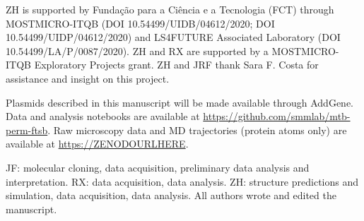 \documentclass[twocolumn,pdflatex,sn-nature]{sn-jnl}%
\begin{document}

ZH is supported by Fundação para a Ciência e a Tecnologia (FCT) through MOSTMICRO-ITQB (DOI 10.54499/UIDB/04612/2020; DOI 10.54499/UIDP/04612/2020) and LS4FUTURE Associated Laboratory (DOI 10.54499/LA/P/0087/2020).
ZH and RX are supported by a MOSTMICRO-ITQB Exploratory Projects grant.
ZH and JRF thank Sara F. Costa for assistance and insight on this project.


Plasmids described in this manuscript will be made available through AddGene.
Data and analysis notebooks are available at \url{https://github.com/smmlab/mtb-perm-ftsb}.
Raw microscopy data and MD trajectories (protein atoms only) are available at \url{https://ZENODOURLHERE}.


JF: molecular cloning, data acquisition, preliminary data analysis and interpretation. RX: data acquisition, data analysis. ZH: structure predictions and simulation, data acquisition, data analysis. All authors wrote and edited the manuscript.

\end{document}
